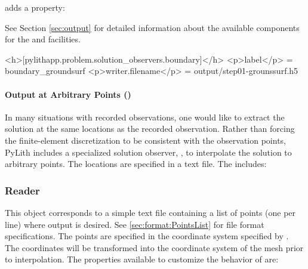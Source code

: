  adds a property:
\begin{inventory}
\end{inventory}
See Section \vref{sec:output} for detailed information about the
available components for the  and  facilities.

\begin{cfg}
<h>[pylithapp.problem.solution_observers.boundary]</h>
<p>label</p> = boundary_groundsurf
<p>writer.filename</p> = output/step01-grounssurf.h5
\end{cfg}

\paragraph{Output at Arbitrary Points (\protect{})}
\label{sec:output:points}

In many situations with recorded observations, one would like to
extract the solution at the same locations as the recorded
observation. Rather than forcing the finite-element discretization to
be consistent with the observation points, PyLith includes a
specialized solution observer, , to interpolate
the solution to arbitrary points. The locations
are specified in a text file. The 
includes:
\begin{inventory}
\end{inventory}

\subsubsection{ Reader}

This object corresponds to a simple text file containing a list of
points (one per line) where output is desired. See \vref{sec:format:PointsList}
for file format specifications. The points are specified in the coordinate
system specified by . The coordinates will be transformed
into the coordinate system of the mesh prior to interpolation. The
properties available to customize the behavior of 
are:
\begin{inventory}
\end{inventory}



